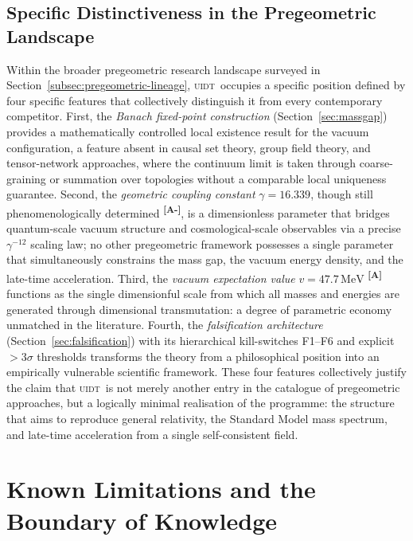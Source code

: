 \documentclass[12pt,a4paper,twoside]{article}
\theoremstyle{plain}
\theoremstyle{definition}
\theoremstyle{remark}
\newcommand{\UIDT}{\textsc{uidt}}
\newcommand{\MeV}{\,\mathrm{MeV}}
\newcommand{\catmark}[1]{\textsuperscript{\textsf{\textbf{[#1]}}}}
\newcommand{\GammaGeom}{16.339}                     %
\newcommand{\vVEV}{47.7\MeV}                        %
\begin{document}
\subsection{Specific Distinctiveness in the Pregeometric Landscape}
\label{subsec:distinctiveness}

Within the broader pregeometric research landscape surveyed in
Section~\ref{subsec:pregeometric-lineage}, \UIDT\ occupies a specific position
defined by four specific features that collectively distinguish it from every
contemporary competitor. First, the \emph{Banach fixed-point construction}
(Section~\ref{sec:massgap}) provides a mathematically controlled local
existence result for the vacuum configuration, a feature absent in causal set theory, group field
theory, and tensor-network approaches, where the continuum limit is taken
through coarse-graining or summation over topologies without a comparable
local uniqueness guarantee. Second, the \emph{geometric coupling constant}
$\gamma = \GammaGeom$, though still phenomenologically determined
\catmark{A-}, is a dimensionless parameter that bridges quantum-scale vacuum
structure and cosmological-scale observables via a precise $\gamma^{-12}$
scaling law; no other pregeometric framework possesses a single parameter that
simultaneously constrains the mass gap, the vacuum energy density, and the
late-time acceleration. Third, the \emph{vacuum expectation value}
$v = \vVEV$ \catmark{A} functions as the single dimensionful scale from which
all masses and energies are generated through dimensional transmutation: a
degree of parametric economy unmatched in the literature. Fourth, the
\emph{falsification architecture} (Section~\ref{sec:falsification}) with its
hierarchical kill-switches F1--F6 and explicit $> 3\sigma$ thresholds
transforms the theory from a philosophical position into an empirically
vulnerable scientific framework. These four features collectively justify the
claim that \UIDT\ is not merely another entry in the catalogue of pregeometric
approaches, but a logically minimal realisation of the programme: the structure
that aims to reproduce general relativity, the Standard Model mass spectrum, and
late-time acceleration from a single self-consistent field.

\newpage

\section{Known Limitations and the Boundary of Knowledge}
\label{sec:limitations}
\end{document}
